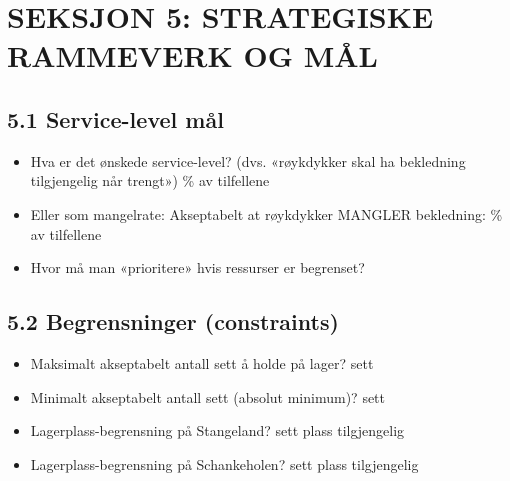 \documentclass[12pt, a4paper, norsk]{article}
\begin{document}
\newpage

\section*{SEKSJON 5: STRATEGISKE RAMMEVERK OG MÅL}

\subsection*{5.1 Service-level mål}

\vspace{0.3cm}

\begin{itemize}
\item[\textbf{Q:}] Hva er det ønskede service-level? (dvs. «røykdykker skal ha bekledning tilgjengelig når trengt»)
  \newline\underline{\hspace{6cm}} \% av tilfellene

\item[\textbf{Q:}] Eller som mangelrate:
  \newline Akseptabelt at røykdykker MANGLER bekledning: \underline{\hspace{4cm}} \% av tilfellene

\item[\textbf{Q:}] Hvor må man «prioritere» hvis ressurser er begrenset?
  \newline\underline{\hspace{12cm}}
\end{itemize}

\subsection*{5.2 Begrensninger (constraints)}

\vspace{0.3cm}

\begin{itemize}
\item[\textbf{Q:}] Maksimalt akseptabelt antall sett å holde på lager?
  \newline\underline{\hspace{6cm}} sett

\item[\textbf{Q:}] Minimalt akseptabelt antall sett (absolut minimum)?
  \newline\underline{\hspace{6cm}} sett

\item[\textbf{Q:}] Lagerplass-begrensning på Stangeland?
  \newline\underline{\hspace{6cm}} sett plass tilgjengelig

\item[\textbf{Q:}] Lagerplass-begrensning på Schankeholen?
  \newline\underline{\hspace{6cm}} sett plass tilgjengelig
\end{itemize}
\end{document}
